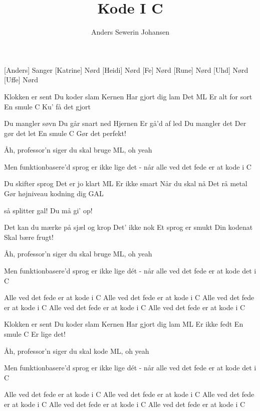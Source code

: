 \documentclass[a4paper,12pt]{article}
\title{Kode I C}
\author{Anders Sewerin Johansen}
\begin{document}
\maketitle

\begin{roles}
 [Anders] Sanger
 [Katrine] Nørd
 [Heidi] Nørd
 [Fe] Nørd
 [Rune] Nørd
 [Uhd] Nørd
 [Uffe] Nørd
\end{roles}

\begin{song}

Klokken er sent
Du koder slam
Kernen
Har gjort dig lam
Det ML
Er alt for sort
En smule C
Ku' få det gjort

Du mangler søvn
Du går snart ned
Hjernen
Er gå'd af led
Du mangler det
Der gør det let
En smule C
Gør det perfekt!

Åh, professor'n siger du skal bruge ML, oh yeah

Men funktionbasere'd sprog er ikke lige det -
når alle ved det fede er at kode i C

Du skifter sprog
Det er jo klart
ML
Er ikke smart
Når du skal nå
Det rå metal
Gør højniveau
kodning dig GAL

så splitter gal!
Du må gi' op!

Det kan du mærke
på sjæl og krop
Det' ikke nok
Et sprog er smukt
Din kodenat
Skal bære frugt!

Åh, professor'n siger du skal bruge ML, oh yeah

Men funktionbasere'd sprog er ikke lige dét -
når alle ved det fede er at kode det i C

Alle ved det fede er at kode i C
Alle ved det fede er at kode i C
Alle ved det fede er at kode i C
Alle ved det fede er at kode i C
Alle ved det fede er at kode i C

Klokken er sent
Du koder slam
Kernen
Har gjort dig lam
ML
Er ikke fedt
En smule C
Er lige det!

Åh, professor'n siger du skal kode ML, oh yeah

Men funktionbasere'd sprog er ikke lige dét -
når alle ved det fede er at kode det i C

Alle ved det fede er at kode i C
Alle ved det fede er at kode i C
Alle ved det fede er at kode i C
Alle ved det fede er at kode i C
Alle ved det fede er at kode i C


\end{song}
\end{document}
